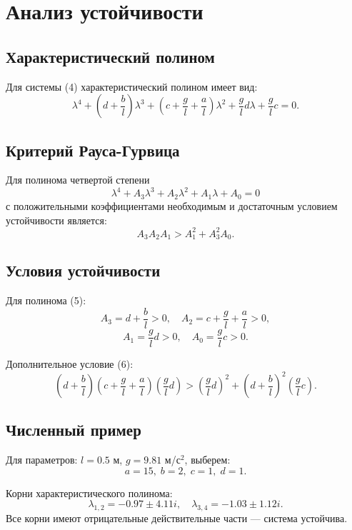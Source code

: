 \section{Анализ устойчивости}

\subsection{Характеристический полином}
Для системы (4) характеристический полином имеет вид:
\[
\lambda^4 + \left(d + \frac{b}{l}\right)\lambda^3 + \left(c + \frac{g}{l} + \frac{a}{l}\right)\lambda^2 + \frac{g}{l}d\lambda + \frac{g}{l}c = 0. \tag{5}
\]

\subsection{Критерий Рауса-Гурвица}
Для полинома четвертой степени
\[
\lambda^4 + A_3\lambda^3 + A_2\lambda^2 + A_1\lambda + A_0 = 0
\]
с положительными коэффициентами необходимым и достаточным условием устойчивости является:
\[
A_3 A_2 A_1 > A_1^2 + A_3^2 A_0. \tag{6}
\]

\subsection{Условия устойчивости}
Для полинома (5):
\[
A_3 = d + \frac{b}{l} > 0, \quad A_2 = c + \frac{g}{l} + \frac{a}{l} > 0,
\]
\[
A_1 = \frac{g}{l}d > 0, \quad A_0 = \frac{g}{l}c > 0.
\]

Дополнительное условие (6):
\[
\left(d + \frac{b}{l}\right)\left(c + \frac{g}{l} + \frac{a}{l}\right)\left(\frac{g}{l}d\right) > 
\left(\frac{g}{l}d\right)^2 + \left(d + \frac{b}{l}\right)^2 \left(\frac{g}{l}c\right). \tag{7}
\]

\subsection{Численный пример}
Для параметров: \(l = 0.5\) м, \(g = 9.81\) м/с\(^2\), выберем:
\[
a = 15,\; b = 2,\; c = 1,\; d = 1.
\]

Корни характеристического полинома:
\[
\lambda_{1,2} = -0.97 \pm 4.11i,\quad \lambda_{3,4} = -1.03 \pm 1.12i.
\]
Все корни имеют отрицательные действительные части — система устойчива.